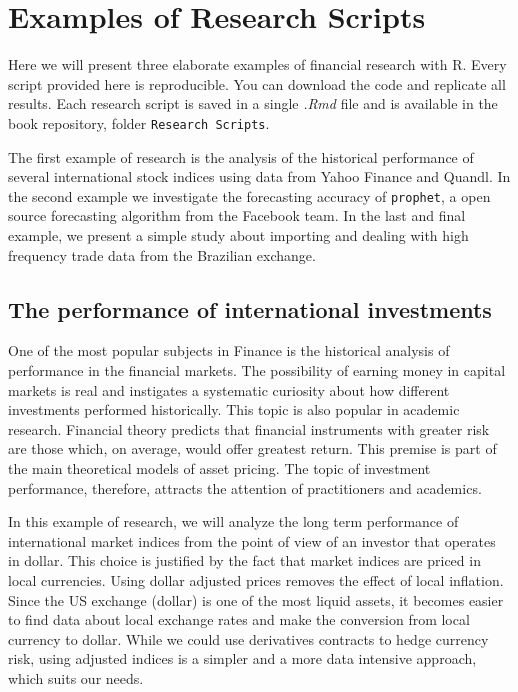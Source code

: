 \documentclass[11pt,]{book}
\begin{document}
\section{Examples of Research Scripts}\label{ExampleResearch}

Here we will present three elaborate examples of financial research with
R. Every script provided here is reproducible. You can download the code
and replicate all results. Each research script is saved in a single
\emph{.Rmd} file and is available in the book repository, folder
\texttt{Research\ Scripts}.

The first example of research is the analysis of the historical
performance of several international stock indices using data from Yahoo
Finance and Quandl. In the second example we investigate the forecasting
accuracy of \texttt{prophet}, a open source forecasting algorithm from
the Facebook team. In the last and final example, we present a simple
study about importing and dealing with high frequency trade data from
the Brazilian exchange.

\subsection{The performance of international
investments}\label{research-performance}

One of the most popular subjects in Finance is the historical analysis
of performance in the financial markets. The possibility of earning
money in capital markets is real and instigates a systematic curiosity
about how different investments performed historically. This topic is
also popular in academic research. Financial theory predicts that
financial instruments with greater risk are those which, on average,
would offer greatest return. This premise is part of the main
theoretical models of asset pricing. The topic of investment
performance, therefore, attracts the attention of practitioners and
academics.

In this example of research, we will analyze the long term performance
of international market indices from the point of view of an investor
that operates in dollar. This choice is justified by the fact that
market indices are priced in local currencies. Using dollar adjusted
prices removes the effect of local inflation. Since the US exchange
(dollar) is one of the most liquid assets, it becomes easier to find
data about local exchange rates and make the conversion from local
currency to dollar. While we could use derivatives contracts to hedge
currency risk, using adjusted indices is a simpler and a more data
intensive approach, which suits our needs.
\end{document}
